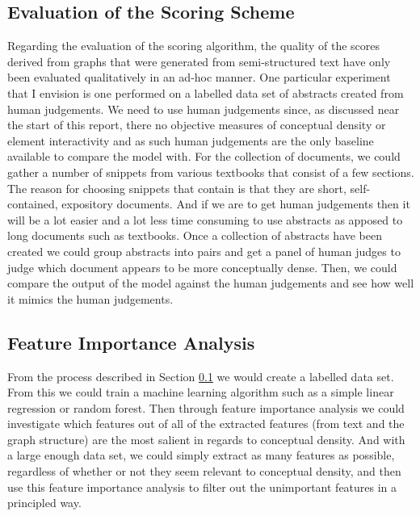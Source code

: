 \documentclass[12pt]{article}
\begin{document}
\subsection{Evaluation of the Scoring Scheme} \label{sec:evaluation_of_the_model}
Regarding the evaluation of the scoring algorithm, the quality of the scores derived from graphs that were generated from semi-structured text have only been evaluated qualitatively in an ad-hoc manner. One particular experiment that I envision is one performed on a labelled data set of abstracts created from human judgements. We need to use human judgements since, as discussed near the start of this report, there no objective measures of conceptual density or element interactivity and as such human judgements are the only baseline available to compare the model with. For the collection of documents, we could gather a number of snippets from various textbooks that consist of a few sections. The reason for choosing snippets that contain is that they are short, self-contained, expository documents. And if we are to get human judgements then it will be a lot easier and a lot less time consuming to use abstracts as apposed to long documents such as textbooks. Once a collection of abstracts have been created we could group abstracts into pairs and get a panel of human judges to judge which document appears to be more conceptually dense.  Then, we could compare the output of the model against the human judgements and see how well it mimics the human judgements.

\subsection{Feature Importance Analysis}
From the process described in Section \ref{sec:evaluation_of_the_model} we would create a labelled data set. From this we could train a machine learning algorithm such as a simple linear regression or random forest. Then through feature importance analysis we could investigate which features out of all of the extracted features (from text and the graph structure) are the most salient in regards to conceptual density. And with a large enough data set, we could simply extract as many features as possible, regardless of whether or not they seem relevant to conceptual density, and then use this feature importance analysis to filter out the unimportant features in a principled way.
\end{document}
